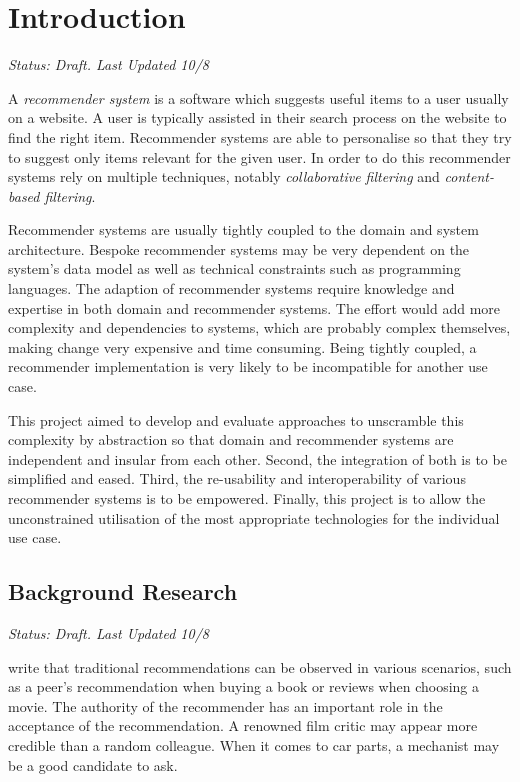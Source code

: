 \chapter{Introduction}

\emph{Status: Draft. Last Updated 10/8}

A \emph{recommender system} is a software which suggests useful items to a user usually on a website. A user is typically assisted in their search process on the website to find the right item. Recommender systems are able to personalise so that they try to suggest only items relevant for the given user. In order to do this recommender systems rely on multiple techniques, notably \emph{collaborative filtering} and \emph{content-based filtering}.

Recommender systems are usually tightly coupled to the domain and system architecture. Bespoke recommender systems may be very dependent on the system's data model as well as technical constraints such as programming languages. The adaption of recommender systems require knowledge and expertise in both domain and recommender systems. The effort would add more complexity and dependencies to systems, which are probably complex themselves, making change very expensive and time consuming. Being tightly coupled, a recommender implementation is very likely to be incompatible for another use case.

This project aimed to develop and evaluate approaches to unscramble this complexity by abstraction so that domain and recommender systems are independent and insular from each other. Second, the integration of both is to be simplified and eased. Third, the re-usability and interoperability of various recommender systems is to be empowered. Finally, this project is to allow the unconstrained utilisation of the most appropriate technologies for the individual use case.

\section{Background Research}

\emph{Status: Draft. Last Updated 10/8}

\citet{ricci11} write that traditional recommendations can be observed in various scenarios, such as a peer's recommendation when buying a book or reviews when choosing a movie. The authority of the recommender has an important role in the acceptance of the recommendation. A renowned film critic may appear more credible than a random colleague. When it comes to car parts, a mechanist may be a good candidate to ask.

